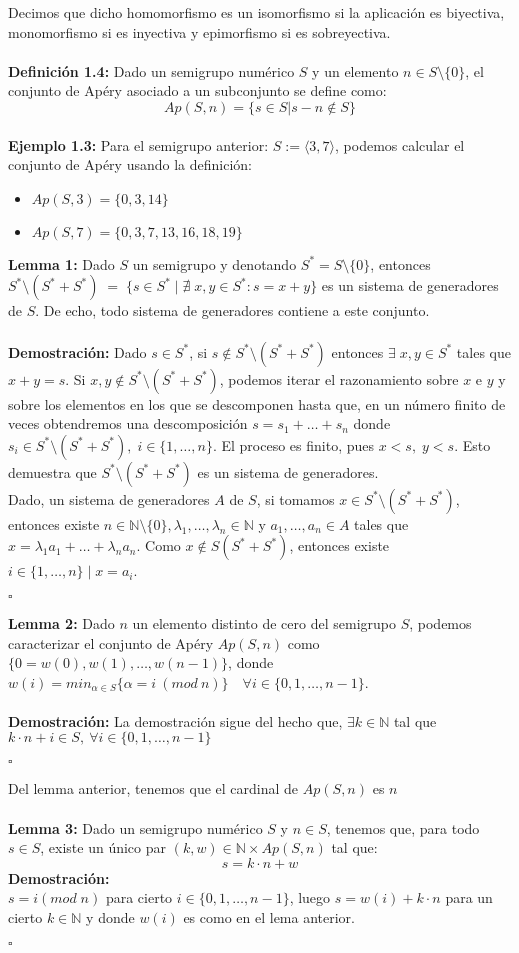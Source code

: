 \documentclass[11pt,spanish]{book}
\newcommand{\qed}{\begin{flushright} $\square$ \end{flushright}}
\begin{document}
Decimos que dicho homomorfismo es un isomorfismo si la aplicación es biyectiva, monomorfismo si es inyectiva y epimorfismo si es sobreyectiva.\\
\\ \textbf{Definición 1.4:} Dado un semigrupo numérico $S$ y un elemento $n\in S\setminus\{0\}$, el conjunto de Apéry asociado a un subconjunto se define como:
$$ Ap(S,n) = \{s\in S | s-n\notin S\} $$\\
\textbf{Ejemplo 1.3: } Para el semigrupo anterior: $S:=\langle{3,7}\rangle$, podemos calcular el conjunto de Apéry usando la definición:
\begin{itemize}
\item $Ap(S,3)=\{0,3,14\}$
\item $Ap(S,7)=\{0,3,7,13,16,18,19\}$
\end{itemize}
\textbf{Lemma 1: } Dado $S$ un semigrupo y denotando $S^{*}=S\setminus \{0\}$, entonces $S^{*}\setminus (S^{*}+S^{*}) \;=\; \{s\in S^{*} \; |\; \nexists\; x,y\in S^{*} : s=x+y\}$ es un sistema de generadores de $S$. De echo, todo sistema de generadores contiene a este conjunto.\\
\\ \textbf{Demostración:} Dado $s\in S^{*}$, si $s\notin S^{*}\setminus (S^{*}+S^{*})$ entonces $\exists \; x,y\in S^{*}$ tales que $x+y=s$. Si $x, y\notin S^{*}\setminus (S^{*}+S^{*})$, podemos iterar el razonamiento sobre $x$ e $y$ y sobre los elementos en los que se descomponen hasta que, en un número finito de veces obtendremos una descomposición $s=s_{1}+\ldots+s_{n}$ donde $s_{i}\in S^{*}\setminus (S^{*}+S^{*}),\; i\in \{1,\ldots,n\}$. El proceso es finito, pues $x<s,\; y<s$. Esto demuestra que $S^{*}\setminus (S^{*}+S^{*})$ es un sistema de generadores.\\

Dado, un sistema de generadores $A$ de $S$, si tomamos $x\in S^{*}\setminus (S^{*}+S^{*})$, entonces existe $n\in \mathbb{N}\setminus\{0\}, \lambda_{1},\ldots,\lambda_{n}\in\mathbb{N}$ y $a_{1},\ldots,a_{n}\in A$ tales que $x=\lambda_{1}a_{1}+\ldots+\lambda_{n}a_{n}$. Como $x\notin S(S^{*}+S^{*})$, entonces existe $i\in\{1,\ldots,n\}\; |\; x=a_{i}$.
\qed
\textbf{Lemma 2:} Dado $n$ un elemento distinto de cero del semigrupo $S$, podemos caracterizar el conjunto de Apéry $Ap(S,n)$ como $\{0=w(0), w(1),\ldots,w(n-1)\}$, donde $w(i) = min_{\alpha\in S}\{\alpha = i\:(mod\: n)\}\quad \forall i\in\{0,1,\ldots,n-1\}$. \\ \\
\textbf{Demostración:} La demostración sigue del hecho que,  $\exists k\in \mathbb{N}$ tal que $k\cdot n + i \in S,\: \forall i\in \{0,1,\ldots,n-1\}$ 
\qed
Del lemma anterior, tenemos que el cardinal de $Ap(S, n)$ es $n$\\ \\
\textbf{Lemma 3:} Dado un semigrupo numérico $S$ y $n\in S$, tenemos que, para todo $s\in S$, existe un único par $(k,w)\in \mathbb{N}\times Ap(S,n)$ tal que:
$$s=k\cdot n + w$$ 
\textbf{Demostración:} 
\\ $s = i (mod\; n)$ para cierto $i\in \{0,1,\ldots,n-1\}$, luego $s=w(i)+k\cdot n$ para un cierto $k\in \mathbb{N}$ y donde $w(i)$ es como en el lema anterior.
\qed
\end{document}
